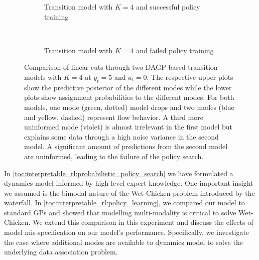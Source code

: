 \begin{figure}[tp]
    \centering
    \begin{subfigure}[t]{\linewidth}
        \centering
        
        
        \caption{
            \label{fig:interpretable_rl:wetchicken:good_cut}
            Transition model with $K=4$ and successful policy training
        }
    \end{subfigure}\\[\figureskip]
    \vspace*{-5pt} %
    \begin{subfigure}[t]{\linewidth}
        \centering
        
        
        \caption{
            \label{fig:interpretable_rl:wetchicken:bad_cut}
            Transition model with $K=4$ and failed policy training
        }
    \end{subfigure}
    \caption{
        \label{fig:interpretable_rl:wetchicken:cut_comparison}
        Comparison of linear cuts through two DAGP-based transition models with $K=4$ at $y_t = 5$ and $a_t=0$.
        The respective upper plots show the predictive posterior of the different modes while the lower plots show assignment probabilities to the different modes.
        For both models, one mode (green, dotted) model drops and two modes (blue and yellow, dashed) represent flow behavior.
        A third more uninformed mode (violet) is almost irrelevant in the first model but explains some data through a high noise variance in the second model.
        A significant amount of predictions from the second model are uninformed, leading to the failure of the policy search.
    }
\end{figure}
In \cref{toc:interpretable_rl:probabilistic_policy_search} we have formulated a dynamics model informed by high-level expert knowledge.
One important insight we assumed is the bimodal nature of the Wet-Chicken problem introduced by the waterfall.
In \cref{toc:interpretable_rl:policy_learning}, we compared our model to standard GPs and showed that modelling multi-modality is critical to solve Wet-Chicken.
We extend this comparison in this experiment and discuss the effects of model mis-specification on our model's performance.
Specifically, we investigate the case where additional modes are available to dynamics model to solve the underlying data association problem.

